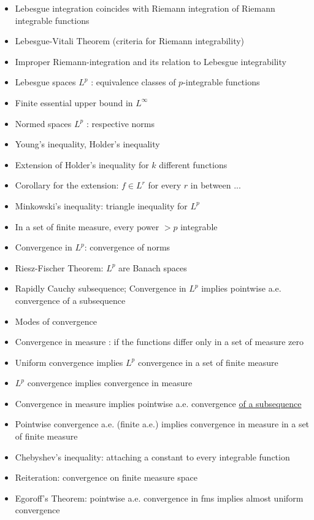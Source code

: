 \documentclass[12pt]{article}
\begin{document}
\begin{itemize}
    \item Lebesgue integration coincides with Riemann integration of Riemann integrable functions
    \item Lebesgue-Vitali Theorem (criteria for Riemann integrability)
    \item Improper Riemann-integration and its relation to Lebesgue integrability
    \item Lebesgue spaces $L^p$ : equivalence classes of $p$-integrable functions
    \item Finite essential upper bound in $L^\infty$
    \item Normed spaces $L^p$ : respective norms
    \item Young's inequality, Holder's inequality
    \item Extension of Holder's inequality for $k$ different functions
    \item Corollary for the extension: $f\in L^r$ for every $r$ in between ...
    \item Minkowski's inequality: triangle inequality for $L^p$
    \item In a set of finite measure, every power $>p$ integrable
    \item Convergence in $L^p$: convergence of norms
    \item Riesz-Fischer Theorem: $L^p$ are Banach spaces
    \item Rapidly Cauchy subsequence; Convergence in $L^p$ implies pointwise a.e. convergence of a subsequence
    \item Modes of convergence
    \item Convergence in measure : if the functions differ only in a set of measure zero
    \item Uniform convergence implies $L^p$ convergence in a set of finite measure
    \item $L^p$ convergence implies convergence in measure
    \item Convergence in measure implies pointwise a.e. convergence \underline{of a subsequence}
    \item Pointwise convergence a.e. (finite a.e.) implies convergence in measure in a set of finite measure
    \item Chebyshev's inequality: attaching a constant to every integrable function
    \item Reiteration: convergence on finite measure space
    \item Egoroff's Theorem: pointwise a.e. convergence in fms implies almost uniform convergence

\end{itemize}
\end{document}
